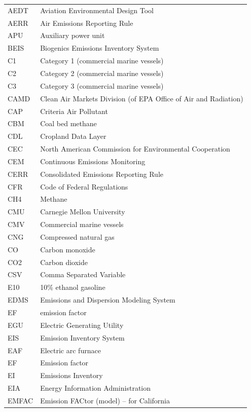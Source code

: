 \documentclass[
  11pt,
  oneside]{book}
\begin{document}
\begin{longtable}{ll}
\toprule
AEDT & Aviation Environmental Design Tool\\
AERR & Air Emissions Reporting Rule\\
APU & Auxiliary power unit\\
BEIS & Biogenics Emissions Inventory System\\
C1 & Category 1 (commercial marine vessels)\\
\addlinespace
C2 & Category 2 (commercial marine vessels)\\
C3 & Category 3 (commercial marine vessels)\\
CAMD & Clean Air Markets Division (of EPA Office of Air and Radiation)\\
CAP & Criteria Air Pollutant\\
CBM & Coal bed methane\\
\addlinespace
CDL & Cropland Data Layer\\
CEC & North American Commission for Environmental Cooperation\\
CEM & Continuous Emissions Monitoring\\
CERR & Consolidated Emissions Reporting Rule\\
CFR & Code of Federal Regulations\\
\addlinespace
CH4 & Methane\\
CMU & Carnegie Mellon University\\
CMV & Commercial marine vessels\\
CNG & Compressed natural gas\\
CO & Carbon monoxide\\
\addlinespace
CO2 & Carbon dioxide\\
CSV & Comma Separated Variable\\
E10 & 10\% ethanol gasoline\\
EDMS & Emissions and Dispersion Modeling System\\
EF & emission factor\\
\addlinespace
EGU & Electric Generating Utility\\
EIS & Emission Inventory System\\
EAF & Electric arc furnace\\
EF & Emission factor\\
EI & Emissions Inventory\\
\addlinespace
EIA & Energy Information Administration\\
EMFAC & Emission FACtor (model) – for California\\

\end{longtable}
\end{document}
